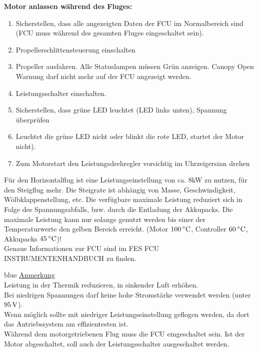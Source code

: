 \textbf{Motor anlassen während des Fluges:}
\begin{enumerate}
\item Sicherstellen, dass alle angezeigten Daten der FCU im Normalbereich sind (FCU muss während des gesamten Fluges eingeschaltet sein).
\item Propellerschlittensteuerung einschalten
\item Propeller ausfahren. Alle Statuslampen müssen Grün anzeigen. Canopy Open Warnung darf nicht mehr auf der FCU angezeigt werden.
\item Leistungsschalter einschalten.
\item Sicherstellen, dass grüne LED leuchtet (LED links unten), Spannung überprüfen
\item Leuchtet die grüne LED nicht oder blinkt die rote LED, startet der Motor nicht). 
\item Zum Motorstart den Leistungsdrehregler vorsichtig im Uhrzeigersinn drehen
\end{enumerate}

Für den Horizontalflug ist eine Leistungseinstellung von ca. 8kW zu nutzen, für den
Steigflug mehr. Die Steigrate ist abhängig von Masse, Geschwindigkeit, Wölbklappenstellung, etc.
Die verfügbare maximale Leistung reduziert sich in Folge des Spannungsabfalls, bzw.
durch die Entladung der Akkupacks. Die maximale Leistung kann nur solange genutzt werden bis einer der Temperaturwerte den gelben Bereich erreicht. (Motor $\unit[100]{^\circ C}$, Controller $\unit[60]{^\circ C}$, Akkupacks $\unit[45]{^\circ C}$)!\\

Genaue Informationen zur FCU sind im FES FCU INSTRUMENTENHANDBUCH zu finden.\\

\begin{color}{blue}
\large{\underline{Anmerkung}}\\
Leistung in der Thermik reduzieren, in sinkender Luft erhöhen.\\
Bei niedrigen Spannungen darf keine hohe Stromstärke verwendet werden (unter
$\unit[95]{V}$).\\
Wenn möglich sollte mit niedriger Leistungseinstellung geflogen werden, da dort das
Antriebssystem am effizientesten ist.\\
Während dem motorgetriebenen Flug muss die FCU eingeschaltet sein. Ist der Motor
abgeschaltet, soll auch der Leistungsschalter ausgeschaltet werden.
\end{color}

